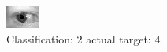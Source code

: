 \begin{figure}[h!]
\begin{center}
\includegraphics[width=0.60\columnwidth]{figures/ID817_class_2_target_4.png}
\end{center}
\caption{ Classification: 2 actual target: 4}
\label{fig:ID817_class_2_target_4}
\end{figure}
